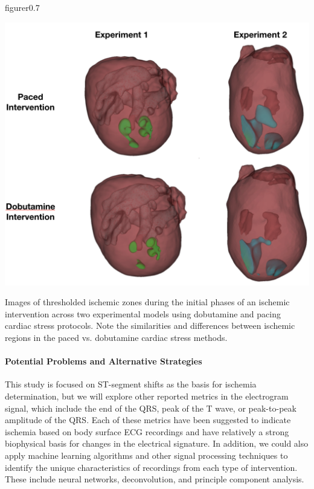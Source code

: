 \begin{wrapfloat}{figure}{r}{0.7\textwidth}
	\begin{center}
		{\includegraphics[width=.7\textwidth]
			{../Figures/DobutvsPacing.png}}
		\captionsetup{width = .7\textwidth}
		\caption{\small \label{fig:dobutPacingThreshold} Images of thresholded ischemic zones during the initial phases of an ischemic intervention across two experimental models using dobutamine and pacing cardiac stress protocols. Note the similarities and differences between ischemic regions in the paced vs. dobutamine cardiac stress methods. }
	\end{center}
\end{wrapfloat}


\paragraph{Potential Problems and Alternative Strategies} This study is
focused on ST-segment shifts as the basis for ischemia determination, but
we will explore other reported metrics in the electrogram signal, which
include the end of the QRS, peak of the T wave, or peak-to-peak amplitude
of the QRS. Each of these metrics have been suggested to indicate ischemia based on body surface ECG recordings and have relatively a strong biophysical basis for changes in the electrical signature. In addition, we could also apply machine learning algorithms and other signal processing techniques to identify the unique characteristics of recordings from each type of intervention. These include neural networks, deconvolution, and principle component analysis. 



